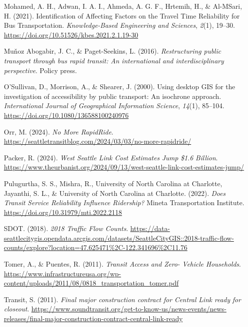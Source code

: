 \documentclass[
  12pt,
]{article}
\newlength{\cslhangindent}
\newenvironment{CSLReferences}[2] %
 {\begin{list}{}{%
  \setlength{\itemindent}{0pt}
  \setlength{\leftmargin}{0pt}
  \setlength{\parsep}{0pt}
  \ifodd #1
   \setlength{\leftmargin}{\cslhangindent}
   \setlength{\itemindent}{-1\cslhangindent}
  \fi
  \setlength{\itemsep}{#2\baselineskip}}}
 {\end{list}}
\begin{document}
\begin{CSLReferences}{1}{0}
Mohamed, A. H., Adwan, I. A. I., Ahmeda, A. G. F., Hrtemih, H., \&
Al-MSari, H. (2021). Identification of {Affecting} {Factors} on the
{Travel} {Time} {Reliability} for {Bus} {Transportation}.
\emph{Knowledge-Based Engineering and Sciences}, \emph{2}(1), 19--30.
\url{https://doi.org/10.51526/kbes.2021.2.1.19-30}

Muňoz Abogabir, J. C., \& Paget-Seekins, L. (2016). \emph{Restructuring
public transport through bus rapid transit: An international and
interdisciplinary perspective}. Policy press.

O'Sullivan, D., Morrison, A., \& Shearer, J. (2000). Using desktop {GIS}
for the investigation of accessibility by public transport: An isochrone
approach. \emph{International Journal of Geographical Information
Science}, \emph{14}(1), 85--104.
\url{https://doi.org/10.1080/136588100240976}

Orr, M. (2024). \emph{No {More} {RapidRide}}.
\url{https://seattletransitblog.com/2024/03/03/no-more-rapidride/}

Packer, R. (2024). \emph{West {Seattle} {Link} {Cost} {Estimates} {Jump}
\$1.6 {Billion}}.
\url{https://www.theurbanist.org/2024/09/13/west-seattle-link-cost-estimates-jump/}

Pulugurtha, S. S., Mishra, R., University of North Carolina at
Charlotte, Jayanthi, S. L., \& University of North Carolina at
Charlotte. (2022). \emph{Does {Transit} {Service} {Reliability}
{Influence} {Ridership}?} Mineta Transportation Institute.
\url{https://doi.org/10.31979/mti.2022.2118}

SDOT. (2018). \emph{2018 {Traffic} {Flow} {Counts}}.
\url{https://data-seattlecitygis.opendata.arcgis.com/datasets/SeattleCityGIS::2018-traffic-flow-counts/explore?location=47.625471\%2C-122.341696\%2C11.76}

Tomer, A., \& Puentes, R. (2011). \emph{Transit {Access} and {Zero}-
{Vehicle} {Households}}.
\url{https://www.infrastructureusa.org/wp-content/uploads/2011/08/0818_transportation_tomer.pdf}

Transit, S. (2011). \emph{Final major construction contract for
{Central} {Link} ready for closeout}.
\url{https://www.soundtransit.org/get-to-know-us/news-events/news-releases/final-major-construction-contract-central-link-ready}


\end{CSLReferences}
\end{document}
